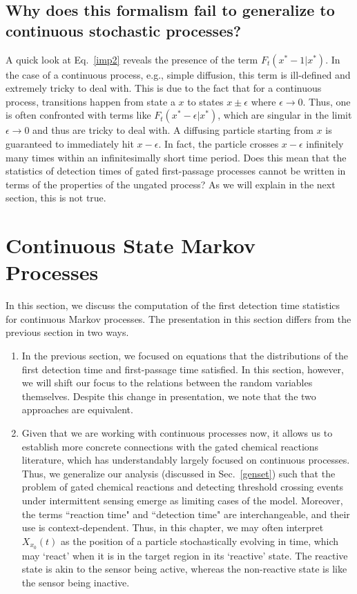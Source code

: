 \subsection{Why does this formalism fail to generalize to continuous stochastic processes?}\label{fail}

A quick look at Eq.~\eqref{imp2} reveals the presence of the term $F_t(x^*-1|x^*)$. In the case of a continuous process, e.g., simple diffusion, this term is ill-defined and extremely tricky to deal with. This is due to the fact that for a continuous process, transitions happen from state a $x$ to states $x \pm \epsilon$ where $\epsilon\to 0$. Thus, one is often confronted with terms like $F_t(x^*-\epsilon|x^*)$, which are singular in the limit $\epsilon\to 0$ and thus are tricky to deal with. A diffusing particle starting from $x$ is guaranteed to immediately hit $x-\epsilon$. In fact, the particle crosses $x-\epsilon$ infinitely many times within an infinitesimally short time period. Does this mean that the statistics of detection times of gated first-passage processes cannot be written in terms of the properties of the ungated process? As we will explain in the next section, this is not true. 

\section{Continuous State Markov Processes}

In this section, we discuss the computation of the first detection time statistics for continuous Markov processes. The presentation in this section differs from the previous section in two ways.
\begin{enumerate}
    \item In the previous section, we focused on equations that the distributions of the first detection time and first-passage time satisfied. In this section, however, we will shift our focus to the relations between the random variables themselves. Despite this change in presentation, we note that the two approaches are equivalent.
    \item Given that we are working with continuous processes now, it allows us to establish more concrete connections with the gated chemical reactions literature, which has understandably largely focused on continuous processes. Thus, we generalize our analysis (discussed in Sec.~\ref{genset}) such that the problem of gated chemical reactions and detecting threshold crossing events under intermittent sensing emerge as limiting cases of the model. Moreover, the terms ``reaction time" and ``detection time" are interchangeable, and their use is context-dependent. Thus, in this chapter, we may often interpret $X_{x_0}(t)$ as the position of a particle stochastically evolving in time, which may `react' when it is in the target region in its `reactive' state. The reactive state is akin to the sensor being active, whereas the non-reactive state is like the sensor being inactive.
\end{enumerate}

